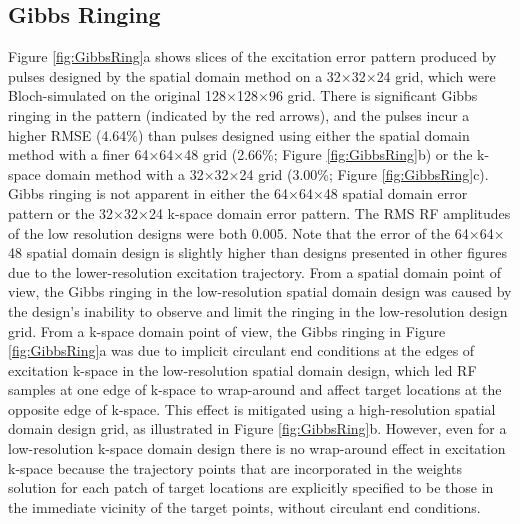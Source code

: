 \subsection*{Gibbs Ringing}
Figure \ref{fig:GibbsRing}a shows slices of the excitation error pattern produced by pulses designed by the spatial domain method
on a 32$\times$32$\times$24 grid, which were Bloch-simulated on the original 128$\times$128$\times$96 grid. 
There is significant Gibbs ringing in the pattern (indicated by the red arrows),
and the pulses incur a higher RMSE (4.64\%) than pulses designed using either the spatial domain method with a finer 64$\times$64$\times$48 grid
(2.66\%; Figure \ref{fig:GibbsRing}b) or the k-space domain method with a 32$\times$32$\times$24 grid (3.00\%; Figure \ref{fig:GibbsRing}c). 
Gibbs ringing is not apparent in either the 64$\times$64$\times$48 spatial domain error pattern or the 32$\times$32$\times$24 k-space domain error pattern. 
The RMS RF amplitudes of the low resolution designs were both 0.005. 
Note that the error of the 64$\times$64$\times$48 spatial domain design is slightly higher than designs presented in other figures
due to the lower-resolution excitation trajectory. 
From a spatial domain point of view, 
the Gibbs ringing in the low-resolution spatial domain design was caused by the design's inability to observe and limit the ringing in the low-resolution design grid. 
From a k-space domain point of view, the Gibbs ringing in 
Figure \ref{fig:GibbsRing}a was due to implicit circulant end conditions at the edges of excitation k-space in the low-resolution
spatial domain design,
which led RF samples at one edge of k-space to wrap-around and affect target locations at the opposite edge of k-space. 
This effect is mitigated using a high-resolution spatial domain design grid, as illustrated in Figure \ref{fig:GibbsRing}b. 
However, even for a low-resolution k-space domain design there is no wrap-around effect in excitation k-space 
because the trajectory points that are incorporated in the weights solution for each patch of target locations are explicitly specified to be those in the immediate vicinity of 
the target points, without circulant end conditions. 




